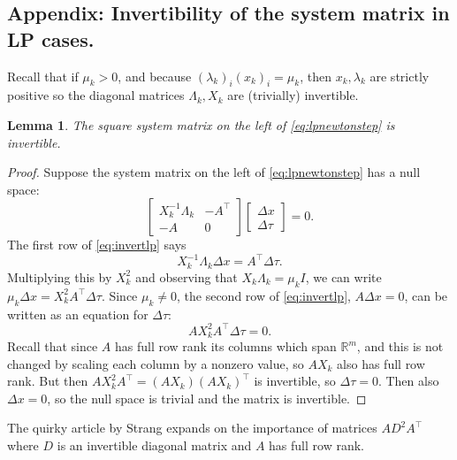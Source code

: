 \documentclass[11pt]{article}
\newcommand{\RR}{\mathbb{R}}
\begin{document}
\medskip




\appendix
\subsection*{Appendix: Invertibility of the system matrix in LP cases.}

\newtheorem*{lemma}{Lemma}

Recall that if $\mu_k>0$, and because $(\lambda_k)_i (x_k)_i = \mu_k$, then $x_k,\lambda_k$ are strictly positive so the diagonal matrices $\Lambda_k,X_k$ are (trivially) invertible.

\begin{lemma}
The square system matrix on the left of \eqref{eq:lpnewtonstep} is invertible.
\end{lemma}

\begin{proof}  Suppose the system matrix on the left of \eqref{eq:lpnewtonstep} has a null space:
\begin{equation}
\begin{bmatrix}
X_k^{-1}\Lambda_k  & -A^\top \\
-A                 & 0
\end{bmatrix}
\begin{bmatrix}
\Delta x \\
\Delta \tau
\end{bmatrix}
= 0. \label{eq:invertlp}
\end{equation}
The first row of \eqref{eq:invertlp} says
    $$X_k^{-1}\Lambda_k \Delta x = A^\top \Delta\tau.$$
Multiplying this by $X_k^2$ and observing that $X_k\Lambda_k = \mu_k I$, we can write $\mu_k\Delta x = X_k^2 A^\top \Delta \tau$.  Since $\mu_k\ne 0$, the second row of \eqref{eq:invertlp}, $A\Delta x=0$, can be written as an equation for $\Delta\tau$:
    $$A X_k^2 A^\top \Delta \tau = 0.$$
Recall that since $A$ has full row rank its columns which span $\RR^m$, and this is not changed by scaling each column by a nonzero value, so $AX_k$ also has full row rank.  But then $A X_k^2 A^\top = (AX_k) (AX_k)^\top$ is invertible, so $\Delta \tau=0$.  Then also $\Delta x=0$, so the null space is trivial and the matrix is invertible.\end{proof}

The quirky article by Strang \cite{Strang1987} expands on the importance of matrices $A D^2 A^\top$ where $D$ is an invertible diagonal matrix and $A$ has full row rank.
\end{document}
